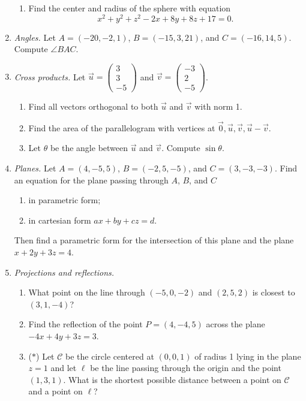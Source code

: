 \begin{enumerate}
\begin{enumerate}
\item Find the center and radius of the sphere with equation
\begin{equation*}
x^2 + y^2 + z^2 - 2x + 8y + 8z + 17 = 0.
\end{equation*}
\end{enumerate}
\item \emph{Angles.} Let $A = (-20,-2,1)$, $B = (-15,3,21)$, and $C = (-16,14,5)$. Compute $\angle BAC$.
\item \emph{Cross products.} Let $\vec{u} = \begin{pmatrix} 3 \\ 3 \\ -5 \end{pmatrix}$ and $\vec{v} = \begin{pmatrix} -3 \\ 2 \\ -5 \end{pmatrix}$.
\begin{enumerate}
\item Find all vectors orthogonal to both $\vec{u}$ and $\vec{v}$ with norm 1.
\item Find the area of the parallelogram with vertices at $\vec{0}, \vec{u}, \vec{v}, \vec{u} - \vec{v}$.
\item Let $\theta$ be the angle between $\vec{u}$ and $\vec{v}$. Compute $\sin\theta$.
\end{enumerate}
\item \emph{Planes.} Let $A = (4,-5,5)$, $B = (-2,5,-5)$, and $C = (3,-3,-3)$. Find an equation for the plane passing through $A$, $B$, and $C$
\begin{enumerate}
\item in parametric form;
\item in cartesian form $ax + by + cz = d$.
\end{enumerate}
Then find a parametric form for the intersection of this plane and the plane $x + 2y + 3z = 4$.
\newpage
\item \emph{Projections and reflections.}
\begin{enumerate}
\item What point on the line through $(-5,0,-2)$ and $(2,5,2)$ is closest to $(3,1,-4)$?
\item Find the reflection of the point $P = (4,-4,5)$ across the plane $-4x + 4y + 3z = 3$.
\item ($*$) Let $\mathcal{C}$ be the circle centered at $(0,0,1)$ of radius 1 lying in the plane $z = 1$ and let $\ell$ be the line passing through the origin and the point $(1,3,1)$. What is the shortest possible distance between a point on $\mathcal{C}$ and a point on $\ell$?

\end{enumerate}
\end{enumerate}
